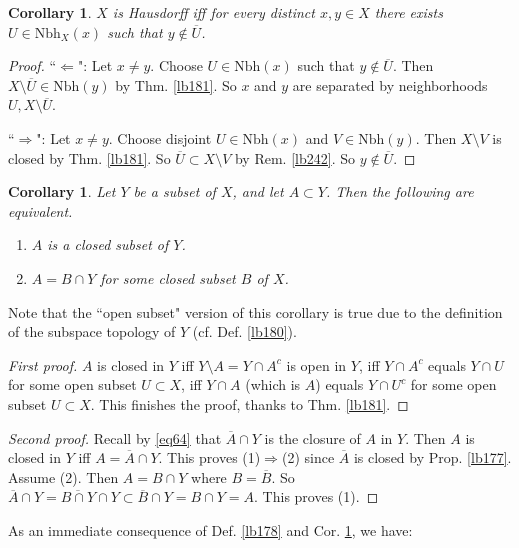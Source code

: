 \documentclass[12pt,b5paper,notitlepage]{article}
\theoremstyle{definition}
\theoremstyle{plain}
\newtheorem{co}[df]{Corollary}
\newcommand{\ovl}{\overline}
\newcommand{\Nbh}{\mathrm{Nbh}}
\numberwithin{equation}{section}
\begin{document}
\begin{co}\label{lb243}
$X$ is Hausdorff iff for every distinct $x,y\in X$ there exists $U\in\Nbh_X(x)$ such that $y\notin \ovl U$.
\end{co}

\begin{proof}
``$\Leftarrow$": Let $x\neq y$. Choose $U\in\Nbh(x)$ such that $y\notin\ovl U$. Then $X\setminus \ovl U\in\Nbh(y)$ by Thm. \ref{lb181}. So $x$ and $y$ are separated by neighborhoods $U,X\setminus\ovl U$.

``$\Rightarrow$": Let $x\neq y$. Choose disjoint $U\in\Nbh(x)$ and $V\in\Nbh(y)$. Then $X\setminus V$ is closed by Thm. \ref{lb181}. So $\ovl U\subset X\setminus V$ by Rem. \ref{lb242}. So $y\notin\ovl U$.
\end{proof}

\begin{co}\label{lb190}
Let $Y$ be a subset of $X$, and let $A\subset Y$. Then the following are equivalent.
\begin{enumerate}[label=(\arabic*)]
\item $A$ is a closed subset of $Y$.
\item $A=B\cap Y$ for some closed subset $B$ of $X$.
\end{enumerate}
\end{co}

Note that the ``open subset" version of this corollary is true due to the definition of the subspace topology of $Y$ (cf. Def. \ref{lb180}).

\begin{proof}[First proof]
$A$ is closed in $Y$ iff $Y\setminus A=Y\cap A^c$ is open in $Y$, iff $Y\cap A^c$ equals $Y\cap U$ for some open subset $U\subset X$, iff $Y\cap A$ (which is $A$) equals $Y\cap U^c$ for some open subset $U\subset X$. This finishes the proof, thanks to Thm. \ref{lb181}.
\end{proof}

\begin{proof}[Second proof]
Recall by \eqref{eq64} that $\ovl A\cap Y$ is the closure of $A$ in $Y$. Then $A$ is closed in $Y$ iff $A=\ovl A\cap Y$. This proves (1)$\Rightarrow$(2) since $\ovl A$ is closed by Prop. \ref{lb177}. Assume (2). Then $A=B\cap Y$ where $B=\ovl B$. So $\ovl A\cap Y=\ovl{B\cap Y}\cap Y\subset \ovl B\cap Y=B\cap Y=A$. This proves (1).
\end{proof}


As an immediate consequence of Def. \ref{lb178} and Cor. \ref{lb190}, we have:
\end{document}
